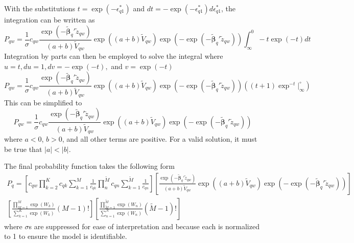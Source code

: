 With the substitutions $t = \exp \left(-\epsilon_{q1}^* \right)$ and $dt = -\exp \left(-\epsilon_{q1}^* \right) d\epsilon_{q1}^*$, the integration can be written as
\begin{equation}\label{eq:prob4}
    P_{qw} = \frac{1}{\sigma} c_{qw} \frac{\exp \left(- \bm{\widetilde{\beta}}_q' \widetilde{z}_{qw} \right) }{\left(a+b\right)\widetilde{V}_{qw}} \exp\left(\left(a+b\right)\widetilde{V}_{qw}\right) \exp\left( - \exp \left(-\bm{\widetilde{\beta}}_q' \widetilde{z}_{qw} \right)\right)
    \int_{\infty}^{0}  - t \exp\left( -t \right) dt
\end{equation}
Integration by parts can then be employed to solve the integral where $u = t, du = 1, dv = -\exp(-t),$ and $v=\exp(-t)$
\begin{equation}\label{eq:prob5}
    P_{qw} = \frac{1}{\sigma} c_{qw} \frac{\exp \left(- \bm{\widetilde{\beta}}_q' \widetilde{z}_{qw} \right) }{\left(a+b\right)\widetilde{V}_{qw}} \exp\left(\left(a+b\right)\widetilde{V}_{qw}\right) \exp\left( - \exp \left(-\bm{\widetilde{\beta}}_q' \widetilde{z}_{qw} \right)\right) \left((t+1)\exp^{-t}\Big|_{\infty}^\circ \right)
\end{equation}
This can be simplified to
\begin{equation}\label{eq:prob6}
    P_{qw} = \frac{1}{\sigma} c_{qw} \frac{\exp \left(- \bm{\widetilde{\beta}}_q' \widetilde{z}_{qw} \right) }{\left(a+b\right)\widetilde{V}_{qw}} \exp\left(\left(a+b\right)\widetilde{V}_{qw}\right) \exp\left( - \exp \left(-\bm{\widetilde{\beta}}_q' \widetilde{z}_{qw} \right)\right)
\end{equation}
where $a<0$, $b>0$, and all other terms are positive. For a valid solution, it must be true that $|a|<|b|$.

The final probability function takes the following form
\begin{equation}\label{eq:finprob}
\begin{split}
    P_{q} = \left[c_{qw} \prod_{k=2}^K c_{qk} \sum_{k=1}^M \frac{1}{c_{qk}} \prod_{n}^{\widetilde{M}} c_{qn} \sum_{k=1}^{\widetilde{M}} \frac{1}{c_{qn}} \right]
    \left[\frac{\exp \left(- \bm{\widetilde{\beta}}_q' \widetilde{z}_{qw} \right) }{\left(a+b\right)\widetilde{V}_{qw}} \exp\left(\left(a+b\right)\widetilde{V}_{qw}\right) \exp\left( - \exp \left(-\bm{\widetilde{\beta}}_q' \widetilde{z}_{qw} \right)\right) \right] \\
    \left[ \frac{\prod\limits_{M=1}^M \exp(W_k)}{\sum\limits_{k=1}^K \exp(W_k)}\left(M-1\right)! \right]
    \left[ \frac{\prod\limits_{\widetilde{M}=1}^{\widetilde{M}} \exp(W_n)}{\sum\limits_{n=1}^N \exp(W_n)}\left(\widetilde{M}-1\right)! \right]
\end{split}
\end{equation}
where $\sigma$s are suppressed for ease of interpretation and because each is normalized to 1 to ensure the model is identifiable.


